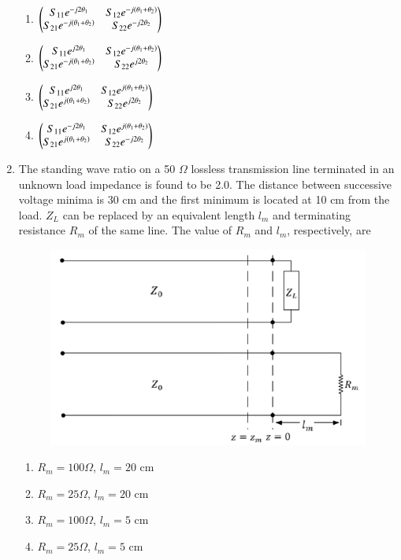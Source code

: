\documentclass[a4paper, 11pt]{article}
\begin{document}
\begin{enumerate}
    \begin{enumerate}
        \item $\begin{pmatrix}S_{11}e^{-j2\theta_1} & S_{12}e^{-j(\theta_1+\theta_2)} \\ S_{21}e^{-j(\theta_1+\theta_2)} & S_{22}e^{-j2\theta_2}\end{pmatrix}$
        \item $\begin{pmatrix}S_{11}e^{j2\theta_1} & S_{12}e^{-j(\theta_1+\theta_2)} \\ S_{21}e^{-j(\theta_1+\theta_2)} & S_{22}e^{j2\theta_2}\end{pmatrix}$
        \item $\begin{pmatrix}S_{11}e^{j2\theta_1} & S_{12}e^{j(\theta_1+\theta_2)} \\ S_{21}e^{j(\theta_1+\theta_2)} & S_{22}e^{j2\theta_2}\end{pmatrix}$
        \item $\begin{pmatrix}S_{11}e^{-j2\theta_1} & S_{12}e^{j(\theta_1+\theta_2)} \\ S_{21}e^{j(\theta_1+\theta_2)} & S_{22}e^{-j2\theta_2}\end{pmatrix}$
    \end{enumerate}
    
    \hfill{}

    \item The standing wave ratio on a 50 $\Omega$ lossless transmission line terminated in an unknown load impedance is found to be 2.0. The distance between successive voltage minima is 30 cm and the first minimum is located at 10 cm from the load. $Z_L$ can be replaced by an equivalent length $l_m$ and terminating resistance $R_m$ of the same line. The value of $R_m$ and $l_m$, respectively, are
    \begin{figure}[H]
        \centering
        \includegraphics[width=0.7\columnwidth]{figs/Q42.png}
        \caption*{}
        \label{fig:q52}
    \end{figure}
    
    \begin{enumerate}
        \item $R_m = 100 \Omega$, $l_m = 20$ cm
        \item $R_m = 25 \Omega$, $l_m = 20$ cm
        \item $R_m = 100 \Omega$, $l_m = 5$ cm
        \item $R_m = 25 \Omega$, $l_m = 5$ cm
    \end{enumerate}
    

\end{enumerate}
\end{document}
